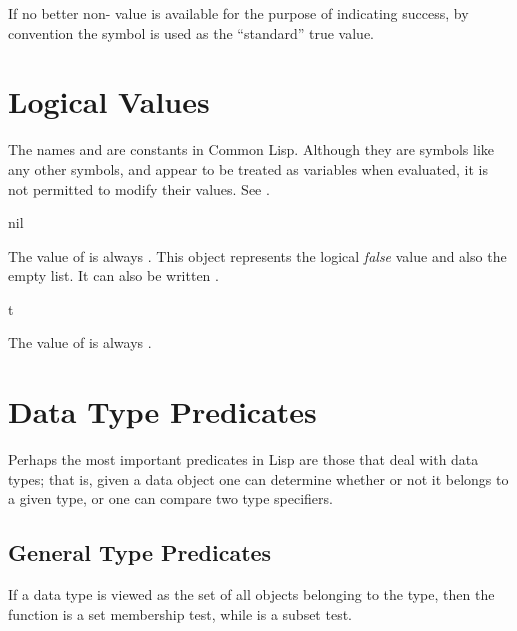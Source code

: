 If no better non-{\nil} value is available for the purpose of indicating
success, by convention the symbol  is used as the ``standard''
true value.

\section{Logical Values}

The names  and  are constants in Common Lisp.  Although they
are symbols like any other symbols, and appear to be treated
as variables when evaluated, it is not permitted to modify their
values.  See .

\begin{defun}[Constant]
nil

The value of {\nil} is always {\nil}.  This object represents the logical
{\it false} value and also the empty list.  It can also be written \cd{()}.
\end{defun}

\begin{defun}[Constant]
t

The value of  is always .
\end{defun}

\section{Data Type Predicates}

Perhaps the most important predicates in Lisp are those that deal
with data types;  that is, given a data object one can determine whether
or not it belongs to a given type, or one can compare two type specifiers.

\subsection{General Type Predicates}

If a data type is viewed as the set of all objects belonging to the type,
then the  function is a set membership test, while 
is a subset test.

